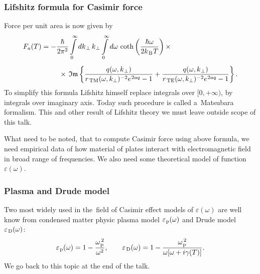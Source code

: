 \documentclass[10pt,t]{beamer}
\begin{document}
\begin{frame}
  \frametitle{Lifshitz formula for Casimir force}

  \vspace{-0.75em}


  Force per unit area is now given by
  \begin{equation}
    \label{eq:First-theoretical-works-04}
    \begin{split}
      F_{ a }( T )
      &=
        -\frac{ \hbar }{ 2 \pi^{ 2 } }
        \int\limits_{ 0 }^{ \infty } dk_{ \hspace{0.05em} \bot } \, k_{ \hspace{0.05em} \bot }
        \int\limits_{ 0 }^{ \infty } d \omega \, \coth\left( \frac{ \hbar \omega }{
        2 k_{ \hspace{0.09em} \text{B} } \hspace{0.05em} T } \right) \times \\[0.5em]
      &\hspace{2.5em}
        \times \, \operatorname{\mathfrak{Im}}\left\{ \frac{ q( \omega, k_{ \hspace{0.05em} \bot } ) }{
        r_{ \, \text{TM} }( \omega, k_{ \bot } )^{ -2 } e^{ \hspace{0.05em} 2 a q } - 1 } +
        \frac{ q( \omega, k_{ \hspace{0.05em} \bot } ) }{
        r_{ \, \text{TE} }( \omega, k_{ \bot } )^{ -2 } e^{ \hspace{0.05em} 2 a q } - 1 }
        \right\}.
    \end{split}
  \end{equation}
  To simplify this formula Lifshitz himself replace integrals over
  $[ 0, + \infty )$, by integrals over imaginary axis. Today such procedure is
  called a~Matsubara formalism. This and other result of Lifshitz theory we
  must leave outside scope of this talk.

  What need to be noted, that to compute Casimir force using above formula,
  we need empirical data of how material of plates interact with
  electromagnetic field in broad range of frequencies. We also need some
  theoretical model of function $\varepsilon( \omega )$.

\end{frame}





\begin{frame}
  \frametitle{Plasma and Drude model}


  Two most widely used in the~field of Casimir effect models of $\varepsilon( \omega )$
  are well know from condensed matter physic plasma model
  $\varepsilon_{ \hspace{0.07em} \text{p} }( \omega )$ and Drude model
  $\varepsilon_{ \hspace{0.09em} \text{D} }( \omega )$:
  \begin{equation}
    \label{eq:First-theoretical-works-05}
    \varepsilon_{ \hspace{0.07em} \text{p} }( \omega ) =
    1 - \frac{ \omega_{ \hspace{0.07em} \text{p} }^{ \, 2 } }{ \omega^{ 2 } }, \qquad
    \varepsilon_{ \hspace{0.09em} \text{D} }( \omega ) =
    1 - \frac{ \omega_{ \hspace{0.07em} \text{p} }^{ \, 2 } }{ \omega [ \omega + i \gamma( T ) ] }.
  \end{equation}
  We go back to this topic at the end of the talk.

\end{frame}
\end{document}
